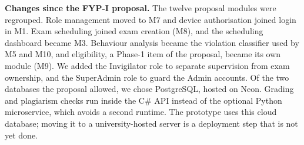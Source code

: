 \textbf{Changes since the FYP-I proposal.} The twelve proposal modules were regrouped. Role management moved to M7 and device authorisation joined login in M1. Exam scheduling joined exam creation (M8), and the scheduling dashboard became M3. Behaviour analysis became the violation classifier used by M5 and M10, and eligibility, a Phase-1 item of the proposal, became its own module (M9). We added the Invigilator role to separate supervision from exam ownership, and the SuperAdmin role to guard the Admin accounts. Of the two databases the proposal allowed, we chose PostgreSQL, hosted on Neon. Grading and plagiarism checks run inside the C\# API instead of the optional Python microservice, which avoids a second runtime. The prototype uses this cloud database; moving it to a university-hosted server is a deployment step that is not yet done.
